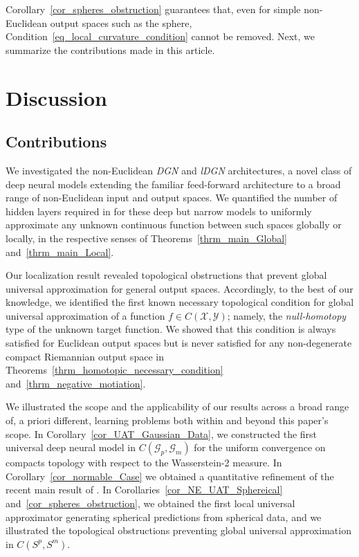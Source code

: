\documentclass[anon,12pt]{colt2021} %
\newcommand{\xxx}{\mathcal{X}}
\newcommand{\yyy}{\mathcal{Y}}
\renewcommand{\ggg}{{\mathscr{G}}}
\begin{document}
Corollary~\ref{cor_spheres_obstruction} guarantees that, even for simple non-Euclidean output spaces such as the sphere, Condition~\ref{eq_local_curvature_condition} cannot be removed.  
Next, we summarize the contributions made in this article.  
\section{Discussion}
\subsection*{Contributions}
We investigated the non-Euclidean \textit{DGN} and \textit{lDGN} architectures, a novel class of deep neural models extending the familiar feed-forward architecture to a broad range of non-Euclidean input and output spaces.  We quantified the number of hidden layers required in for these deep but narrow models to uniformly approximate any unknown continuous function between such spaces globally or locally, in the respective senses of Theorems~\ref{thrm_main_Global} and~\ref{thrm_main_Local}.  

Our localization result revealed topological obstructions that prevent global universal approximation for general output spaces. Accordingly, to the best of our knowledge, we identified the first known necessary topological condition for global universal approximation of a function $f \in C(\xxx,\yyy)$; namely, the \textit{null-homotopy} type of the unknown target function.  We showed that this condition is always satisfied for Euclidean output spaces but is never satisfied for any non-degenerate compact Riemannian output space in Theorems~\ref{thrm_homotopic_necessary_condition} and~\ref{thrm_negative_motiation}.    

We illustrated the scope and the applicability of our results across a broad range of, a priori different, learning problems both within and beyond this paper's scope.  In Corollary~\ref{cor_UAT_Gaussian_Data}, we constructed the first universal deep neural model in $C(\ggg_p,\ggg_m)$ for the uniform convergence on compacts topology with respect to the Wasserstein-2 measure.  In Corollary~\ref{cor_normable_Case} we obtained a quantitative refinement of the recent main result of \cite{kidger2019universal}.  In Corollaries~\ref{cor_NE_UAT_Sphereical} and~\ref{cor_spheres_obstruction}, we obtained the first local universal approximator generating spherical predictions from spherical data, and we illustrated the topological obstructions preventing global universal approximation in $C(S^p, S^m)$.  
\end{document}
